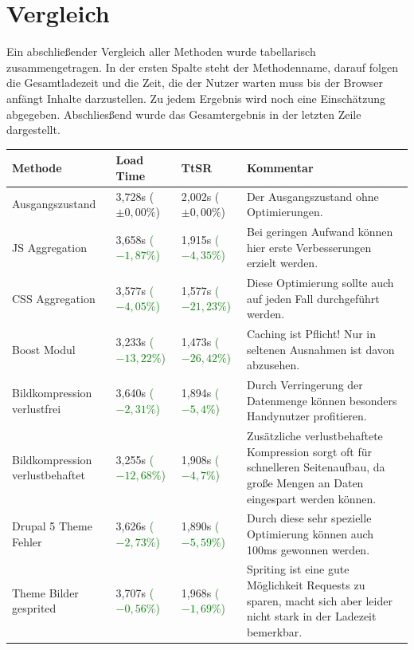 \section{Vergleich}
Ein abschlie\ss{}ender Vergleich aller Methoden wurde tabellarisch zusammengetragen. In der ersten Spalte steht der Methodenname, darauf folgen die Gesamtladezeit und die Zeit, die der Nutzer warten muss bis der Browser anf\"angt Inhalte darzustellen. Zu jedem Ergebnis wird noch eine Einsch\"atzung abgegeben. Abschlies\ss{}end wurde das Gesamtergebnis in der letzten Zeile dargestellt.
\begin{table}
\caption{Auswertung der Ergebnisse}
    \begin{longtable}{ | p{3cm} | p{1.5cm} | p{1.5cm} | p{6cm} |}
 
    \hline
    Methode & Load Time & TtSR & Kommentar \\ \hline
    \hline
    Ausgangszustand 			& 3,728s ($\pm0,00\%$)  				& 2,002s ($\pm0,00\%$) & Der Ausgangszustand ohne Optimierungen. \\ \hline
    JS Aggregation 			& 3,658s \textcolor{green}{($-1,87\%$)}  	& 1,915s \textcolor{green}{($-4,35\%$)} & Bei geringen Aufwand können hier erste Verbesserungen erzielt werden. \\ \hline
    CSS Aggregation 			& 3,577s \textcolor{green}{($-4,05\%$)} 	& 1,577s \textcolor{green}{($-21,23\%$)}& Diese Optimierung sollte auch auf jeden Fall durchgeführt werden. \\ \hline
    Boost Modul 			& 3,233s \textcolor{green}{($-13,22\%$)} 	& 1,473s \textcolor{green}{($-26,42\%$)}& Caching ist Pflicht! Nur in seltenen Ausnahmen ist davon abzusehen. \\ \hline
    Bildkompression verlustfrei 	& 3,640s \textcolor{green}{($-2,31\%$)} 	& 1,894s \textcolor{green}{($-5,4\%$)}& Durch Verringerung der Datenmenge können besonders Handynutzer profitieren.  \\ \hline
    Bildkompression verlustbehaftet 	& 3,255s \textcolor{green}{($-12,68\%$)} 	& 1,908s \textcolor{green}{($-4,7\%$)}& Zusätzliche verlustbehaftete Kompression sorgt oft für schnelleren Seitenaufbau, da große Mengen an Daten eingespart werden können.  \\ \hline
    Drupal 5 Theme Fehler 		& 3,626s \textcolor{green}{($-2,73\%$)} 	& 1,890s \textcolor{green}{($-5,59\%$)}& Durch diese sehr spezielle Optimierung können auch 100ms gewonnen werden.  \\ \hline
    Theme Bilder gesprited 		& 3,707s \textcolor{green}{($-0,56\%$)} 	& 1,968s \textcolor{green}{($-1,69\%$)}& Spriting ist eine gute Möglichkeit Requests zu sparen, macht sich aber leider nicht stark in der Ladezeit bemerkbar.  \\ \hline

\end{longtable}
\end{table}
